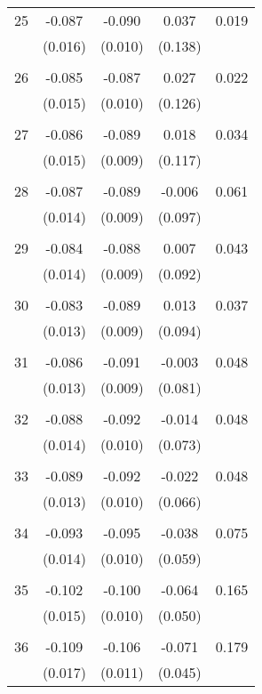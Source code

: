 \begin{tabular}{l*{1}{cccc}}
  25       & -0.087 & -0.090 & 0.037 & 0.019 \\
          & (0.016) & (0.010) & (0.138) & \\
 & & & &\\
  26       & -0.085 & -0.087 & 0.027 & 0.022 \\
          & (0.015) & (0.010) & (0.126) & \\
 & & & &\\
  27       & -0.086 & -0.089 & 0.018 & 0.034 \\
          & (0.015) & (0.009) & (0.117) & \\
 & & & &\\
  28       & -0.087 & -0.089 & -0.006 & 0.061 \\
          & (0.014) & (0.009) & (0.097) & \\
 & & & &\\
  29       & -0.084 & -0.088 & 0.007 & 0.043 \\
          & (0.014) & (0.009) & (0.092) & \\
 & & & &\\
  30       & -0.083 & -0.089 & 0.013 & 0.037 \\
          & (0.013) & (0.009) & (0.094) & \\
 & & & &\\
  31       & -0.086 & -0.091 & -0.003 & 0.048 \\
          & (0.013) & (0.009) & (0.081) & \\
 & & & &\\
  32       & -0.088 & -0.092 & -0.014 & 0.048 \\
          & (0.014) & (0.010) & (0.073) & \\
 & & & &\\
  33       & -0.089 & -0.092 & -0.022 & 0.048 \\
          & (0.013) & (0.010) & (0.066) & \\
 & & & &\\
  34       & -0.093 & -0.095 & -0.038 & 0.075 \\
          & (0.014) & (0.010) & (0.059) & \\
 & & & &\\
  35       & -0.102 & -0.100 & -0.064 & 0.165 \\
          & (0.015) & (0.010) & (0.050) & \\
 & & & &\\
  36       & -0.109 & -0.106 & -0.071 & 0.179 \\
          & (0.017) & (0.011) & (0.045) & \\

\end{tabular}
